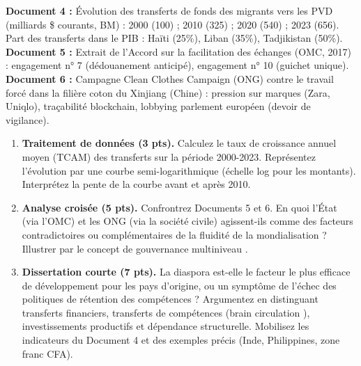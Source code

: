 \documentclass[11pt]{article}
\begin{document}
\begin{exercice}
\textbf{Document 4 :} Évolution des transferts de fonds des migrants vers les PVD (milliards \$ courants, BM) : 2000 (100) ; 2010 (325) ; 2020 (540) ; 2023 (656). Part des transferts dans le PIB : Haïti (25\%), Liban (35\%), Tadjikistan (50\%).
\textbf{Document 5 :} Extrait de l'Accord sur la facilitation des échanges (OMC, 2017) : engagement n° 7 (dédouanement anticipé), engagement n° 10 (guichet unique).
\textbf{Document 6 :} Campagne \og Clean Clothes Campaign \fg (ONG) contre le travail forcé dans la filière coton du Xinjiang (Chine) : pression sur marques (Zara, Uniqlo), traçabilité blockchain, lobbying parlement européen (devoir de vigilance).

\begin{enumerate}
    \item \textbf{Traitement de données (3 pts).} Calculez le taux de croissance annuel moyen (TCAM) des transferts sur la période 2000-2023. Représentez l'évolution par une courbe semi-logarithmique (échelle log pour les montants). Interprétez la pente de la courbe avant et après 2010.
    \item \textbf{Analyse croisée (5 pts).} Confrontrez Documents 5 et 6. En quoi l'État (via l'OMC) et les ONG (via la société civile) agissent-ils comme des facteurs \og contradictoires \fg ou \og complémentaires \fg de la fluidité de la mondialisation ? Illustrer par le concept de \og gouvernance multiniveau \fg.
    \item \textbf{Dissertation courte (7 pts).} \og La diaspora est-elle le facteur le plus efficace de développement pour les pays d'origine, ou un symptôme de l'échec des politiques de rétention des compétences ? \fg Argumentez en distinguant transferts financiers, transferts de compétences (\og brain circulation \fg), investissements productifs et dépendance structurelle. Mobilisez les indicateurs du Document 4 et des exemples précis (Inde, Philippines, zone franc CFA).
\end{enumerate}
\end{exercice}
\end{document}

